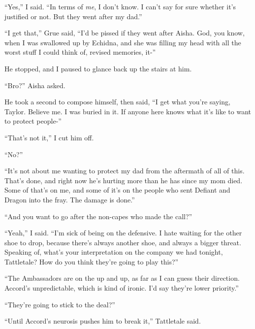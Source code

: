 ``Yes,'' I said.  ``In terms of \emph{me}, I don't know.  I can't say for sure whether it's justified or not.  But they went after my dad.''



``I get that,'' Grue said, ``I'd be pissed if they went after Aisha.  God, you know, when I was swallowed up by Echidna, and she was filling my head with all the worst stuff I could think of, revised memories, it-''



He stopped, and I paused to glance back up the stairs at him.



``Bro?'' Aisha asked.



He took a second to compose himself, then said, ``I get what you're saying, Taylor.  Believe me.  I was buried in it.  If anyone here knows what it's like to want to protect people-''



``That's not it,'' I cut him off.



``No?''



``It's not about me wanting to protect my dad from the aftermath of all of this.  That's done, and right now he's hurting more than he has since my mom died.  Some of that's on me, and some of it's on the people who sent Defiant and Dragon into the fray.  The damage is done.''



``And you want to go after the non-capes who made the call?''



``Yeah,'' I said.  ``I'm sick of being on the defensive.  I hate waiting for the other shoe to drop, because there's always another shoe, and always a bigger threat.  Speaking of, what's your interpretation on the company we had tonight, Tattletale?  How do you think they're going to play this?''



``The Ambassadors are on the up and up, as far as I can guess their direction.  Accord's unpredictable, which is kind of ironic.  I'd say they're lower priority.''



``They're going to stick to the deal?''



``Until Accord's neurosis pushes him to break it,'' Tattletale said.



